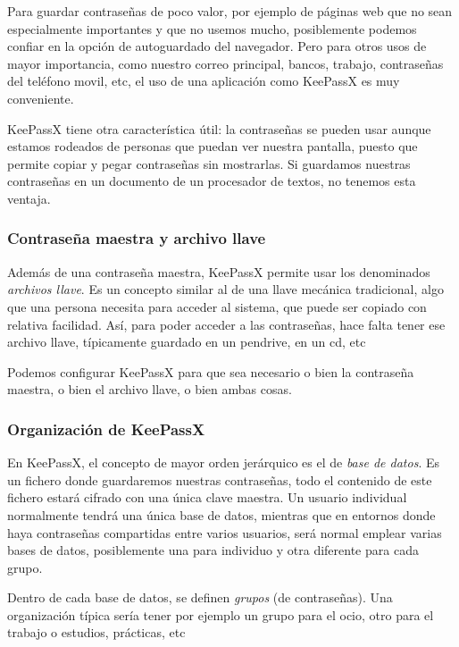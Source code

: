 \documentclass[a4paper,12pt]{article}
\begin{document}
Para guardar contraseñas de poco valor, por ejemplo de páginas web que
no sean especialmente importantes y que no usemos mucho, posiblemente
podemos confiar en la opción de autoguardado del navegador.
Pero para otros usos de mayor importancia, como nuestro correo principal,
bancos, trabajo, contraseñas del teléfono movil, etc, el uso de una
aplicación como KeePassX
es muy conveniente.

KeePassX tiene otra característica útil: la contraseñas se pueden
usar aunque estamos rodeados de personas que puedan ver nuestra pantalla,
puesto que permite copiar y pegar contraseñas sin mostrarlas. 
Si guardamos nuestras contraseñas en un documento de un procesador de
textos, no tenemos esta ventaja.



\subsubsection{Contraseña maestra y archivo llave}
Además de una contraseña maestra, KeePassX permite usar los denominados
\emph{archivos llave}. Es un concepto similar al de una llave mecánica
tradicional, algo que una persona necesita para acceder al sistema,
que puede ser copiado con relativa facilidad. Así, para poder acceder 
a las contraseñas, hace falta tener ese archivo llave, típicamente guardado
en un pendrive, en un cd, etc

Podemos configurar KeePassX para que sea necesario o bien la contraseña maestra,
o bien el archivo llave, o bien ambas cosas.

\subsubsection{Organización de KeePassX}

En KeePassX, el concepto de mayor orden jerárquico es el de
\emph{base de datos}. Es un fichero donde guardaremos nuestras contraseñas, todo
el contenido de este fichero estará cifrado con una única clave maestra. 
Un usuario individual normalmente tendrá una única base de datos, mientras
que en entornos donde haya contraseñas compartidas entre varios usuarios,
será normal emplear varias bases de datos, posiblemente una para individuo
y otra diferente para cada grupo.

Dentro de cada base de datos, se definen \emph{grupos} (de contraseñas).
Una organización típica sería tener por ejemplo un grupo para el ocio, otro
para el trabajo o estudios, prácticas, etc
\end{document}
